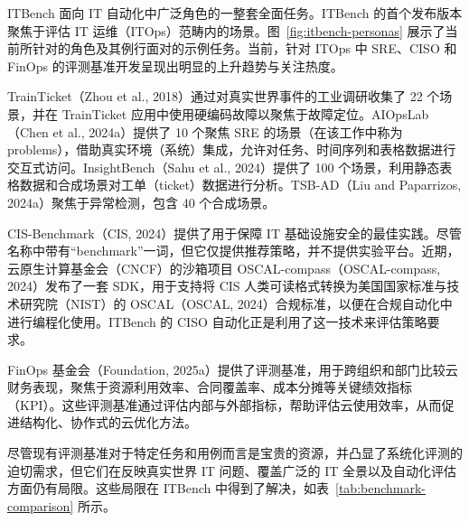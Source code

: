 ITBench 面向 IT 自动化中广泛角色的一整套全面任务。ITBench 的首个发布版本聚焦于评估 IT 运维（ITOps）范畴内的场景。图~\ref{fig:itbench-personas} 展示了当前所针对的角色及其例行面对的示例任务。当前，针对 ITOps 中 SRE、CISO 和 FinOps 的评测基准开发呈现出明显的上升趋势与关注热度。

TrainTicket（Zhou et al., 2018）通过对真实世界事件的工业调研收集了 22 个场景，并在 TrainTicket 应用中使用硬编码故障以聚焦于故障定位。AIOpsLab（Chen et al., 2024a）提供了 10 个聚焦 SRE 的场景（在该工作中称为 problems），借助真实环境（系统）集成，允许对任务、时间序列和表格数据进行交互式访问。InsightBench（Sahu et al., 2024）提供了 100 个场景，利用静态表格数据和合成场景对工单（ticket）数据进行分析。TSB-AD（Liu and Paparrizos, 2024a）聚焦于异常检测，包含 40 个合成场景。

CIS-Benchmark（CIS, 2024）提供了用于保障 IT 基础设施安全的最佳实践。尽管名称中带有“benchmark”一词，但它仅提供推荐策略，并不提供实验平台。近期，云原生计算基金会（CNCF）的沙箱项目 OSCAL-compass（OSCAL-compass, 2024）发布了一套 SDK，用于支持将 CIS 人类可读格式转换为美国国家标准与技术研究院（NIST）的 OSCAL（OSCAL, 2024）合规标准，以便在合规自动化中进行编程化使用。ITBench 的 CISO 自动化正是利用了这一技术来评估策略要求。

FinOps 基金会（Foundation, 2025a）提供了评测基准，用于跨组织和部门比较云财务表现，聚焦于资源利用效率、合同覆盖率、成本分摊等关键绩效指标（KPI）。这些评测基准通过评估内部与外部指标，帮助评估云使用效率，从而促进结构化、协作式的云优化方法。

尽管现有评测基准对于特定任务和用例而言是宝贵的资源，并凸显了系统化评测的迫切需求，但它们在反映真实世界 IT 问题、覆盖广泛的 IT 全景以及自动化评估方面仍有局限。这些局限在 ITBench 中得到了解决，如表~\ref{tab:benchmark-comparison} 所示。


